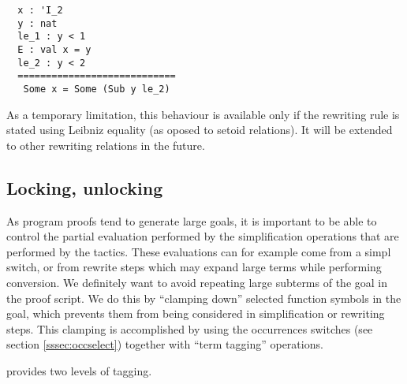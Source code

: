 \begin{lstlisting}
  x : 'I_2
  y : nat
  le_1 : y < 1
  E : val x = y
  le_2 : y < 2
  ============================
   Some x = Some (Sub y le_2)
\end{lstlisting}

As a temporary limitation, this behaviour is available only if the rewriting
rule is stated using Leibniz equality (as oposed to setoid relations). 
It will be extended to other rewriting relations in the future.

\subsection{Locking, unlocking }\label{ssec:lock}

As program proofs tend to generate large goals, it is important to be
able to control the partial evaluation performed by the simplification
operations that are performed by the tactics. These evaluations can
for example come from a \C{/=} simpl switch, or from rewrite steps
which may expand large terms while performing conversion. We definitely
want to avoid repeating large subterms of the goal in
the proof script. We do this by
``clamping down'' selected function symbols in the goal, which
prevents them from
being considered in simplification or rewriting steps. This clamping
is accomplished by using the occurrences switches (see section
\ref{sssec:occselect}) together with ``term tagging'' operations.

\ssr{} provides two levels of tagging.

